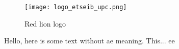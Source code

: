 \documentclass[../main.tex]{subfiles}
\begin{document}
\begin{figure}[bh]
\centering
\texttt{[image: logo\_etseib\_upc.png]}

\label{fig:img1}
\caption{Red lion logo}
\end{figure}

Hello, here is some text without ae meaning.  This... ee
\end{document}
